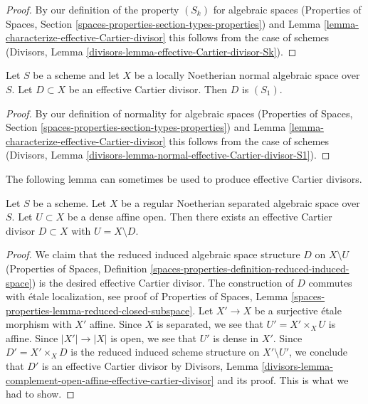 \begin{proof}
By our definition of the property $(S_k)$ for algebraic spaces
(Properties of Spaces, Section
\ref{spaces-properties-section-types-properties})
and
Lemma \ref{lemma-characterize-effective-Cartier-divisor}
this follows from the case of schemes
(Divisors, Lemma \ref{divisors-lemma-effective-Cartier-divisor-Sk}).
\end{proof}

\begin{lemma}
\label{lemma-normal-effective-Cartier-divisor-S1}
Let $S$ be a scheme and let $X$ be a locally Noetherian normal
algebraic space over $S$. Let $D \subset X$ be an
effective Cartier divisor. Then $D$ is $(S_1)$.
\end{lemma}

\begin{proof}
By our definition of normality for algebraic spaces
(Properties of Spaces, Section
\ref{spaces-properties-section-types-properties})
and
Lemma \ref{lemma-characterize-effective-Cartier-divisor}
this follows from the case of schemes
(Divisors, Lemma \ref{divisors-lemma-normal-effective-Cartier-divisor-S1}).
\end{proof}

\noindent
The following lemma can sometimes be used to produce effective
Cartier divisors.

\begin{lemma}
\label{lemma-complement-open-affine-effective-cartier-divisor}
Let $S$ be a scheme. Let $X$ be a regular Noetherian separated algebraic space
over $S$. Let $U \subset X$ be a dense affine open. Then there exists an
effective Cartier divisor $D \subset X$ with $U = X \setminus D$.
\end{lemma}

\begin{proof}
We claim that the reduced induced algebraic space structure $D$
on $X \setminus U$ (Properties of Spaces, Definition
\ref{spaces-properties-definition-reduced-induced-space})
is the desired effective Cartier divisor. The construction
of $D$ commutes with \'etale localization, see proof of
Properties of Spaces, Lemma
\ref{spaces-properties-lemma-reduced-closed-subspace}.
Let $X' \to X$ be a surjective \'etale morphism with $X'$ affine.
Since $X$ is separated, we see that $U' = X' \times_X U$ is
affine. Since $|X'| \to |X|$ is open, we see that $U'$
is dense in $X'$. Since $D' = X' \times_X D$ is the reduced induced
scheme structure on $X' \setminus U'$, we conclude that
$D'$ is an effective Cartier divisor by
Divisors, Lemma
\ref{divisors-lemma-complement-open-affine-effective-cartier-divisor}
and its proof. This is what we had to show.
\end{proof}

